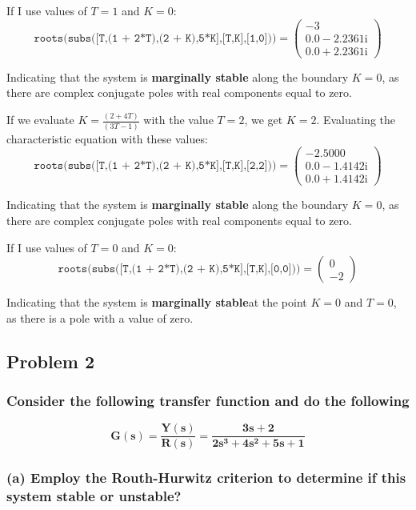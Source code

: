 \documentclass[12pt, letterpaper]{../assignment}
\begin{document}
If I use values of $T =1$ and $K = 0$:
 $$\texttt{roots(subs([T,(1 + 2*T),(2 + K),5*K],[T,K],[1,0]))} =
 \left(\begin{array}{c} -3\\ 0.0-2.2361{}\mathrm{i}\\ 0.0+2.2361{}\mathrm{i} \end{array}\right)$$
\begin{answer}
Indicating that the system is \textbf{marginally stable} along the boundary $K = 0$,
as there are complex conjugate poles with real components equal to zero.
\end{answer}

If we evaluate $ K = \frac{(2 + 4T)}{(3T-1)} $ with the value $T = 2$, we get $K = 2$. Evaluating the characteristic equation with these values:
$$\texttt{roots(subs([T,(1 + 2*T),(2 + K),5*K],[T,K],[2,2]))} =
\left(\begin{array}{c} -2.5000\\ 0.0-1.4142{}\mathrm{i}\\ 0.0+1.4142{}\mathrm{i} \end{array}\right)$$
\begin{answer}
Indicating that the system is \textbf{marginally stable} along the boundary $K = 0$,
as there are complex conjugate poles with real components equal to zero.
\end{answer}

If I use values of $T =0$ and $K = 0$:
 $$\texttt{roots(subs([T,(1 + 2*T),(2 + K),5*K],[T,K],[0,0]))} =
 \left(\begin{array}{c} 0\\ -2 \end{array}\right)$$
\begin{answer}
Indicating that the system is \textbf{marginally stable}at the point $K = 0$ and $T = 0$,
as there is a pole with a value of zero.
\end{answer}



\subsection*{Problem 2}
\subsubsection*{Consider the following transfer function and do the following}
$$ \mathbf{ G(s) = \frac{Y(s)}{R(s)} = \frac{3s+2}{2s^3 + 4s^2 + 5s + 1} } $$
\subsubsection*{(a) Employ the Routh-Hurwitz criterion to determine if this system stable or unstable?}
\end{document}
